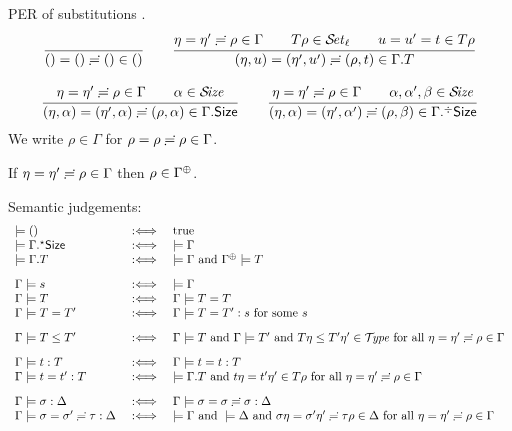 \documentclass[acmlarge,review,anonymous]{acmart}\settopmatter{printfolios=true}
\begin{document}
PER of substitutions
.
\begin{gather*}
  \ru{
    }{\sempty = \sempty \eeq \sempty \in \cempty}
\qquad
  \ru{\eta = \eta' \eeq \rho \in \Gamma \qquad
      T\rho \in \SET[\ell] \qquad
      u = u' = t \in T \rho
    }{\sext \eta u = \sext{\eta'}{u'} \eeq \sext{\rho}{t} \in \cext \Gamma T}
\\[2ex]
  \ru{\eta = \eta' \eeq \rho \in \Gamma \qquad \alpha \in \SIZE
    }{\sext \eta \alpha = \sext{\eta'}{\alpha} \eeq \sext{\rho}{\alpha} \in \cext \Gamma \Size}
\qquad
  \ru{\eta = \eta' \eeq \rho \in \Gamma \qquad \alpha,\alpha',\beta \in \SIZE
    }{\sext \eta \alpha = \sext{\eta'}{\alpha'} \eeq \sext{\rho}{\beta} \in \erext \Gamma \Size}
\end{gather*}
We write $\rho \in \Gamma$ for $\rho = \rho \risingdotseq \rho \in \Gamma$.
\begin{lemma}[Resurrection]
  \label{lem:resenv}
  If\/ $\eta = \eta' \risingdotseq \rho \in \Gamma$ then $\rho \in \resurrect\Gamma$.
\end{lemma}

Semantic judgements:
\[
\begin{array}{l@{\quad}l@{\quad}l}
  \models () & \defas & \mtrue \\
  \models \eext \Gamma \Size & \defas & \models \Gamma \\
  \models \cext \Gamma T     & \defas & \models \Gamma \mand \resurrect\Gamma \models T
\\[2ex]
  \Gamma \models s & \defas & \models \Gamma \\
  \Gamma \models T & \defas & \Gamma \models T = T \\
  \Gamma \models T = T' & \defas & \Gamma \models T = T' : s \mforsome s %
\\[2ex]
  \Gamma \models T \leq T' & \defas & \Gamma \models T \mand \Gamma \models T' \mand
    T\eta \leq T'\eta' \in \TYPE
    \mforall \eta = \eta' \eeq \rho \in \Gamma
\\[2ex]
  \Gamma \models t : T & \defas & \Gamma \models t = t : T \\
  \Gamma \models t = t' : T & \defas & %
    \models \cext \Gamma T \mand
    t \eta = t' \eta' \in T \rho \mforall \eta = \eta' \eeq \rho \in \Gamma
\\[2ex]
  \Gamma \models \sigma : \Delta & \defas & \Gamma \models \sigma = \sigma \eeq \sigma : \Delta \\
  \Gamma \models \sigma = \sigma' \eeq \tau : \Delta & \defas &
    \models \Gamma \mand \models \Delta \mand
    \sigma \eta = \sigma' \eta' \eeq \tau \rho \in \Delta
    \mforall \eta = \eta' \eeq \rho \in \Gamma
\end{array}
\]
\end{document}
